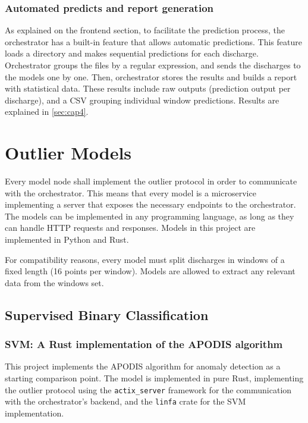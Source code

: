 \subsubsection{Automated predicts and report generation}

As explained on the frontend section, to facilitate the prediction process, the orchestrator has a built-in feature that allows automatic predictions. This feature loads a directory and makes sequential predictions for each discharge. Orchestrator groups the files by a regular expression, and sends the discharges to the models one by one. Then, orchestrator stores the results and builds a report with statistical data. These results include raw outputs (prediction output per discharge), and a CSV grouping individual window predictions. Results are explained in \autoref{sec:cap4}.

\section{Outlier Models}\label{sec:models}

Every model node shall implement the outlier protocol in order to communicate with the orchestrator. This means that every model is a microservice implementing a server that exposes the necessary endpoints to the orchestrator. The models can be implemented in any programming language, as long as they can handle \ac{HTTP} requests and responses. Models in this project are implemented in Python and Rust.

For compatibility reasons, every model must split discharges in windows of a fixed length (16 points per window). Models are allowed to extract any relevant data from the windows set.

\subsection{Supervised Binary Classification}

\subsubsection{\acs{SVM}: A Rust implementation of the \acs{APODIS} algorithm}\label{sec:svm-implementation}

This project implements the \ac{APODIS} algorithm for anomaly detection as a starting comparison point. The model is implemented in pure Rust, implementing the outlier protocol using the \texttt{actix\_server} framework for the communication with the orchestrator's backend, and the \texttt{linfa} crate for the \ac{SVM} implementation.

